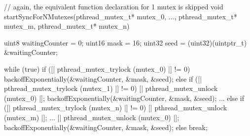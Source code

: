 \begin{ccode}
// again, the equivalent function declaration for 1 mutex is skipped
void startSyncForNMutexes(pthread_mutex_t* mutex_0, ..., pthread_mutex_t* mutex_m, pthread_mutex_t* mutex_n) { 
  uint8 waitingCounter = 0; 
  uint16 mask = 16; 
  uint32 seed = (uint32)(uintptr_t) &waitingCounter;
  
  while (true) { 
    if ([| pthread_mutex_trylock (mutex_0) |] != 0) { 
      backoffExponentially(&waitingCounter, &mask, &seed); 
    } 
    else if ([| pthread_mutex_trylock (mutex_1) |] != 0) { 
      [| pthread_mutex_unlock (mutex_0) |]; 
      backoffExponentially(&waitingCounter, &mask, &seed); 
    } ...
    else if ([| pthread_mutex_trylock (mutex_n) |] != 0) { 
      [| pthread_mutex_unlock (mutex_m) |];
      ...
      [| pthread_mutex_unlock (mutex_0) |]; 
      backoffExponentially(&waitingCounter, &mask, &seed); 
    } 
    else { 
      break; 
    } 
  }
}
\end{ccode}

